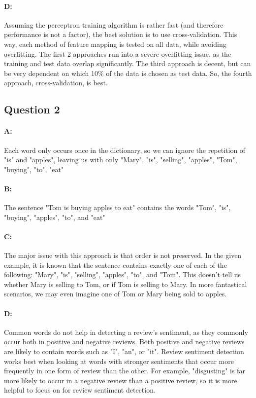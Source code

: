 \documentclass{article}
\begin{document}
\paragraph{D: } Assuming the perceptron training algorithm is rather fast (and therefore performance is not a factor), the best solution is to use cross-validation. This way, each method of feature mapping is tested on all data, while avoiding overfitting. The first 2 approaches run into a severe overfitting issue, as the training and test data overlap significantly. The third approach is decent, but can be very dependent on which 10\% of the data is chosen as test data. So, the fourth approach, cross-validation, is best.

\subsection{Question 2}

\paragraph{A: } Each word only occurs once in the dictionary, so we can ignore the repetition of "is" and "apples", leaving us with only "Mary", "is", "selling", "apples", "Tom", "buying", "to", "eat"

\paragraph{B: } The sentence "Tom is buying apples to eat" contains the words "Tom", "is", "buying", "apples", "to", and "eat"

\paragraph{C: } The major issue with this approach is that order is not preserved. In the given example, it is known that the sentence contains exactly one of each of the following: "Mary", "is", "selling", "apples", "to", and "Tom". This doesn't tell us whether Mary is selling to Tom, or if Tom is selling to Mary. In more fantastical scenarios, we may even imagine one of Tom or Mary being sold to apples.

\paragraph{D: } Common words do not help in detecting a review's sentiment, as they commonly occur both in positive and negative reviews. Both positive and negative reviews are likely to contain words such as "I", "an", or "it". Review sentiment detection works best when looking at words with stronger sentiments that occur more frequently in one form of review than the other. For example, "disgusting" is far more likely to occur in a negative review than a positive review, so it is more helpful to focus on for review sentiment detection.
\end{document}
